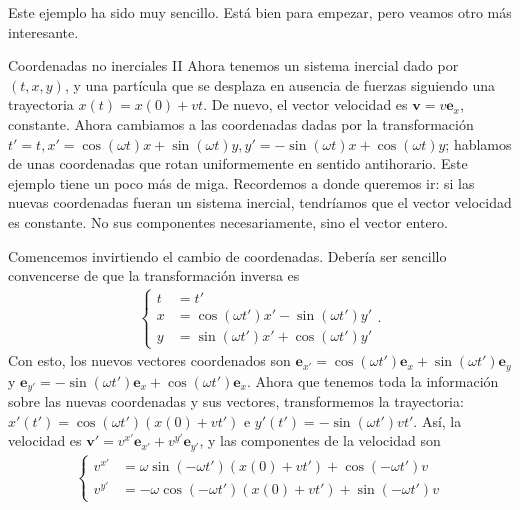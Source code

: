Este ejemplo ha sido muy sencillo. Está bien para empezar, pero veamos otro más interesante.
\begin{example}
    {Coordenadas no inerciales II}
    \label{ex.1-galileo_noinercial_II}
    Ahora tenemos un sistema inercial dado por \((t, x, y)\), y una partícula que se desplaza en ausencia de fuerzas siguiendo una trayectoria \(x(t) = x(0) + vt\). De nuevo, el vector velocidad es \(\mathbf{v} = v\mathbf{e}_x\), constante. Ahora cambiamos a las coordenadas dadas por la transformación \(t' = t, x' = \cos(\omega t)x + \sin(\omega t)y, y' = -\sin(\omega t)x + \cos(\omega t)y\); hablamos de unas coordenadas que rotan uniformemente en sentido antihorario. Este ejemplo tiene un poco más de miga. Recordemos a donde queremos ir: si las nuevas coordenadas fueran un sistema inercial, tendríamos que el vector velocidad es constante. No sus componentes necesariamente, sino el vector entero. 

    Comencemos invirtiendo el cambio de coordenadas. Debería ser sencillo convencerse de que la transformación inversa es 
    \begin{align*}
        \left\{
        \begin{aligned}
            t &= t'\\
            x &= \cos(\omega t')x' - \sin(\omega t')y'\\
            y &= \sin(\omega t')x' + \cos(\omega t')y'
        \end{aligned}\right..
    \end{align*}
    Con esto, los nuevos vectores coordenados son \(\mathbf{e}_{x'} = \cos(\omega t')\mathbf{e}_x + \sin(\omega t')\mathbf{e}_{y}\) y \(\mathbf{e}_{y'} = -\sin(\omega t')\mathbf{e}_x + \cos(\omega t')\mathbf{e}_x\). Ahora que tenemos toda la información sobre las nuevas coordenadas y sus vectores, transformemos la trayectoria: \(x'(t') = \cos(\omega t') (x(0)+vt')\) e \(y'(t') = -\sin(\omega t') vt'\). Así, la velocidad es \(\mathbf{v}' = v^{x'}\mathbf{e}_{x'}+ v^{y'}\mathbf{e}_{y'}\), y las componentes de la velocidad son
    \begin{align*}
        \left\{
        \begin{aligned}        
            v^{x'} &= \omega \sin(-\omega t')(x(0) + vt') + \cos(-\omega t')v\\
            v^{y'} &= -\omega \cos(-\omega t')(x(0) + vt') + \sin(-\omega t')v
        \end{aligned}
        \right.
    \end{align*}


\end{example}

